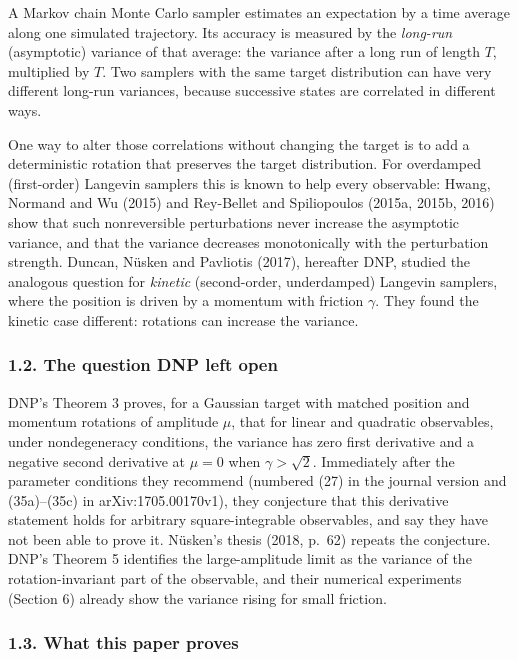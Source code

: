 \documentclass[
  british,
  11pt,
  a4paper,
]{article}
\begin{document}
A Markov chain Monte Carlo sampler estimates an expectation by a time
average along one simulated trajectory. Its accuracy is measured by the
\emph{long-run} (asymptotic) variance of that average: the variance
after a long run of length \(T\), multiplied by \(T\). Two samplers with
the same target distribution can have very different long-run variances,
because successive states are correlated in different ways.

One way to alter those correlations without changing the target is to
add a deterministic rotation that preserves the target distribution. For
overdamped (first-order) Langevin samplers this is known to help every
observable: Hwang, Normand and Wu (2015) and Rey-Bellet and Spiliopoulos
(2015a, 2015b, 2016) show that such nonreversible perturbations never
increase the asymptotic variance, and that the variance decreases
monotonically with the perturbation strength. Duncan, Nüsken and
Pavliotis (2017), hereafter DNP, studied the analogous question for
\emph{kinetic} (second-order, underdamped) Langevin samplers, where the
position is driven by a momentum with friction \(\gamma\). They found
the kinetic case different: rotations can increase the variance.

\subsubsection{1.2. The question DNP left
open}\label{the-question-dnp-left-open}

DNP's Theorem 3 proves, for a Gaussian target with matched position and
momentum rotations of amplitude \(\mu\), that for linear and quadratic
observables, under nondegeneracy conditions, the variance has zero first
derivative and a negative second derivative at \(\mu=0\) when
\(\gamma>\sqrt2\). Immediately after the parameter conditions they
recommend (numbered (27) in the journal version and (35a)--(35c) in
arXiv:1705.00170v1), they conjecture that this derivative statement
holds for arbitrary square-integrable observables, and say they have not
been able to prove it. Nüsken's thesis (2018, p.~62) repeats the
conjecture. DNP's Theorem 5 identifies the large-amplitude limit as the
variance of the rotation-invariant part of the observable, and their
numerical experiments (Section 6) already show the variance rising for
small friction.

\subsubsection{1.3. What this paper
proves}\label{what-this-paper-proves}
\end{document}
